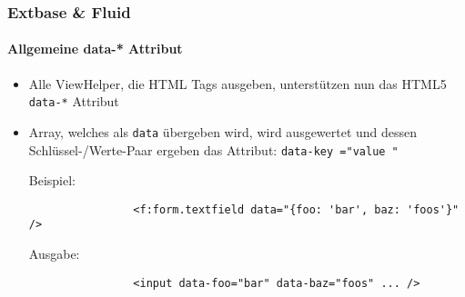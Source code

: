 \begin{frame}[fragile]
	\frametitle{Extbase \& Fluid}
	\framesubtitle{Allgemeine data-* Attribut}

	\begin{itemize}
		\item Alle ViewHelper, die HTML Tags ausgeben, unterstützen nun das HTML5 \texttt{data-*} Attribut

		\item Array, welches als \texttt{data} übergeben wird, wird ausgewertet und dessen
			Schlüssel-/Werte-Paar ergeben das Attribut:
			\texttt{data-\begingroup\color{typo3orange}key\endgroup
				="\begingroup\color{typo3orange}value\endgroup
				"}\newline

			Beispiel:
			\begin{lstlisting}
				<f:form.textfield data="{foo: 'bar', baz: 'foos'}" />
			\end{lstlisting}

			Ausgabe:
			\begin{lstlisting}
				<input data-foo="bar" data-baz="foos" ... />
			\end{lstlisting}
		
	\end{itemize}

\end{frame}


